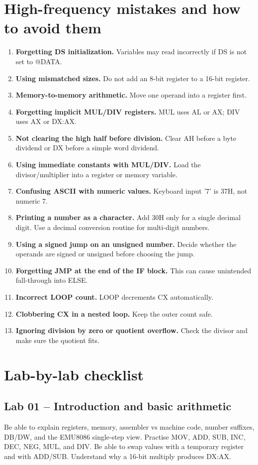 \documentclass[11pt,a4paper]{article}
\begin{document}
\section{High-frequency mistakes and how to avoid them}
\begin{enumerate}
\item \textbf{Forgetting DS initialization.} Variables may read incorrectly if DS is not set to @DATA.
\item \textbf{Using mismatched sizes.} Do not add an 8-bit register to a 16-bit register.
\item \textbf{Memory-to-memory arithmetic.} Move one operand into a register first.
\item \textbf{Forgetting implicit MUL/DIV registers.} MUL uses AL or AX; DIV uses AX or DX:AX.
\item \textbf{Not clearing the high half before division.} Clear AH before a byte dividend or DX before a simple word dividend.
\item \textbf{Using immediate constants with MUL/DIV.} Load the divisor/multiplier into a register or memory variable.
\item \textbf{Confusing ASCII with numeric values.} Keyboard input '7' is 37H, not numeric 7.
\item \textbf{Printing a number as a character.} Add 30H only for a single decimal digit. Use a decimal conversion routine for multi-digit numbers.
\item \textbf{Using a signed jump on an unsigned number.} Decide whether the operands are signed or unsigned before choosing the jump.
\item \textbf{Forgetting JMP at the end of the IF block.} This can cause unintended fall-through into ELSE.
\item \textbf{Incorrect LOOP count.} LOOP decrements CX automatically.
\item \textbf{Clobbering CX in a nested loop.} Keep the outer count safe.
\item \textbf{Ignoring division by zero or quotient overflow.} Check the divisor and make sure the quotient fits.
\end{enumerate}

\section{Lab-by-lab checklist}
\subsection{Lab 01 -- Introduction and basic arithmetic}
Be able to explain registers, memory, assembler vs machine code, number suffixes, DB/DW, and the EMU8086 single-step view. Practise MOV, ADD, SUB, INC, DEC, NEG, MUL, and DIV. Be able to swap values with a temporary register and with ADD/SUB. Understand why a 16-bit multiply produces DX:AX.
\end{document}
